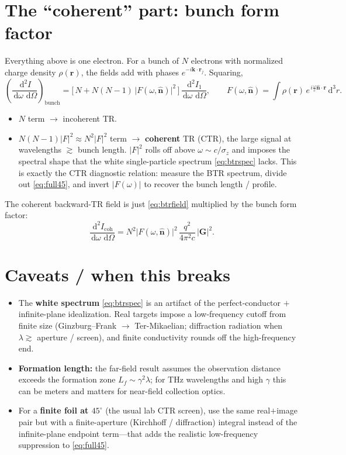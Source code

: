 \documentclass[11pt]{article}
\newcommand{\nhat}{\hat{\bm{n}}}
\newcommand{\br}{\bm{r}}
\newcommand{\bk}{\bm{k}}
\newcommand{\dd}{\,\mathrm{d}}
\begin{document}
\section{The ``coherent'' part: bunch form factor}

Everything above is one electron. For a bunch of $N$ electrons with normalized
charge density $\rho(\br)$, the fields add with phases $e^{-i\bk\cdot\br_j}$.
Squaring,
\begin{equation}
\left(\frac{\dd^2 I}{\dd\omega\,\dd\Omega}\right)_{\!\mathrm{bunch}}
=\Big[\,N+N(N-1)\,\lvert F(\omega,\nhat)\rvert^2\,\Big]\,
\frac{\dd^2 I_1}{\dd\omega\,\dd\Omega},
\qquad
F(\omega,\nhat)=\int\rho(\br)\,e^{\,i\frac{\omega}{c}\nhat\cdot\br}\dd^3r .
\end{equation}
\begin{itemize}
  \item $N$ term $\to$ incoherent TR.
  \item $N(N-1)\lvert F\rvert^2\approx N^2\lvert F\rvert^2$ term $\to$
        \textbf{coherent} TR (CTR), the large signal at wavelengths
        $\gtrsim$ bunch length. $\lvert F\rvert^2$ rolls off above
        $\omega\sim c/\sigma_z$ and imposes the spectral shape that the white
        single-particle spectrum \eqref{eq:btrspec} lacks. This is exactly the
        CTR diagnostic relation: measure the BTR spectrum, divide out
        \eqref{eq:full45}, and invert $\lvert F(\omega)\rvert$ to recover the
        bunch length / profile.
\end{itemize}
The coherent backward-TR field is just \eqref{eq:btrfield} multiplied by the
bunch form factor:
\begin{equation}
\frac{\dd^2 I_{\mathrm{coh}}}{\dd\omega\,\dd\Omega}
=N^2\lvert F(\omega,\nhat)\rvert^2\,\frac{q^2}{4\pi^2 c}\,
\lvert\bm{G}\rvert^2 .
\end{equation}

\section{Caveats / when this breaks}
\begin{itemize}
  \item The \textbf{white spectrum} \eqref{eq:btrspec} is an artifact of the
        perfect-conductor $+$ infinite-plane idealization. Real targets impose
        a low-frequency cutoff from finite size (Ginzburg--Frank
        $\to$ Ter-Mikaelian; diffraction radiation when $\lambda\gtrsim$
        aperture / screen), and finite conductivity rounds off the
        high-frequency end.
  \item \textbf{Formation length:} the far-field result assumes the
        observation distance exceeds the formation zone
        $L_f\sim\gamma^2\lambda$; for THz wavelengths and high $\gamma$ this
        can be meters and matters for near-field collection optics.
  \item For a \textbf{finite foil at $45^\circ$} (the usual lab CTR screen),
        use the same real$+$image pair but with a finite-aperture
        (Kirchhoff / diffraction) integral instead of the infinite-plane
        endpoint term---that adds the realistic low-frequency suppression to
        \eqref{eq:full45}.
\end{itemize}
\end{document}
